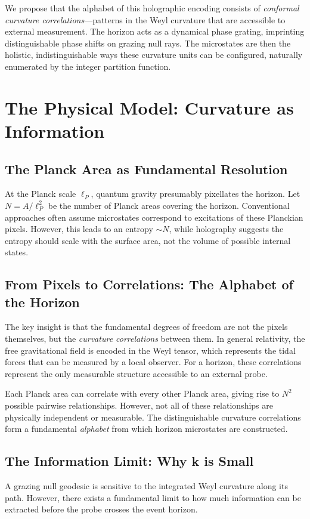 \documentclass[12pt, letterpaper]{article}
\begin{document}
We propose that the alphabet of this holographic encoding consists of \emph{conformal curvature correlations}—patterns in the Weyl curvature that are accessible to external measurement. The horizon acts as a dynamical phase grating, imprinting distinguishable phase shifts on grazing null rays. The microstates are then the holistic, indistinguishable ways these curvature units can be configured, naturally enumerated by the integer partition function.

\section{The Physical Model: Curvature as Information}
\label{sec:model}

\subsection{The Planck Area as Fundamental Resolution}
At the Planck scale $\ell_P$, quantum gravity presumably pixellates the horizon. Let $N = A/\ell_P^2$ be the number of Planck areas covering the horizon. Conventional approaches often assume microstates correspond to excitations of these Planckian pixels. However, this leads to an entropy $\sim N$, while holography suggests the entropy should scale with the surface area, not the volume of possible internal states.

\subsection{From Pixels to Correlations: The Alphabet of the Horizon}
The key insight is that the fundamental degrees of freedom are not the pixels themselves, but the \emph{curvature correlations} between them. In general relativity, the free gravitational field is encoded in the Weyl tensor, which represents the tidal forces that can be measured by a local observer. For a horizon, these correlations represent the only measurable structure accessible to an external probe.

Each Planck area can correlate with every other Planck area, giving rise to $N^2$ possible pairwise relationships. However, not all of these relationships are physically independent or measurable. The distinguishable curvature correlations form a fundamental \emph{alphabet} from which horizon microstates are constructed.

\subsection{The Information Limit: Why k is Small}
A grazing null geodesic is sensitive to the integrated Weyl curvature along its path. However, there exists a fundamental limit to how much information can be extracted before the probe crosses the event horizon. 
\end{document}
